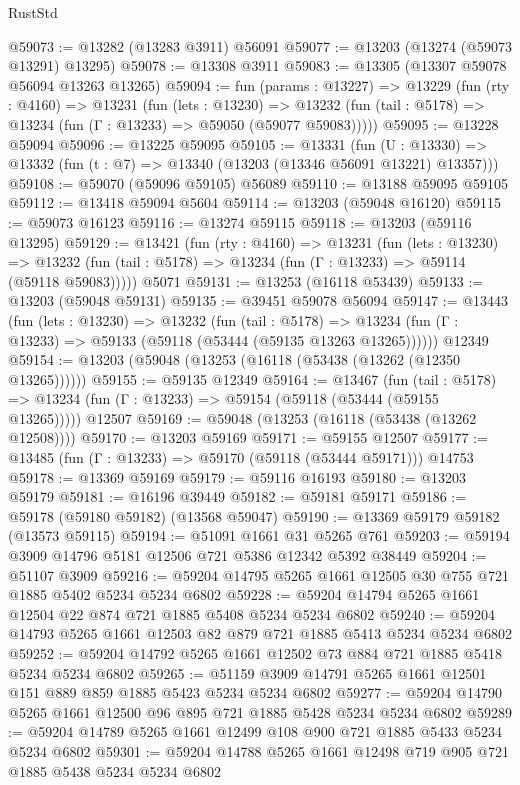 \begin{lexlean}{RustStd}
\begin{coremodule}
@59073 := @13282 (@13283 @3911) @56091
@59077 := @13203 (@13274 (@59073 @13291) @13295)
@59078 := @13308 @3911
@59083 := @13305 (@13307 @59078 @56094 @13263 @13265)
@59094 := fun (params : @13227) =>
  @13229
    (fun (rty : @4160) =>
    @13231
      (fun (lets : @13230) =>
      @13232 (fun (tail : @5178) => @13234 (fun (Γ : @13233) => @59050 (@59077 @59083)))))
@59095 := @13228 @59094
@59096 := @13225 @59095
@59105 := @13331
    (fun (U : @13330) => @13332 (fun (t : @7) => @13340 (@13203 (@13346 @56091 @13221) @13357)))
@59108 := @59070 (@59096 @59105) @56089
@59110 := @13188 @59095 @59105
@59112 := @13418 @59094 @5604
@59114 := @13203 (@59048 @16120)
@59115 := @59073 @16123
@59116 := @13274 @59115
@59118 := @13203 (@59116 @13295)
@59129 := @13421
    (fun (rty : @4160) =>
    @13231
      (fun (lets : @13230) =>
      @13232 (fun (tail : @5178) => @13234 (fun (Γ : @13233) => @59114 (@59118 @59083)))))
    @5071
@59131 := @13253 (@16118 @53439)
@59133 := @13203 (@59048 @59131)
@59135 := @39451 @59078 @56094
@59147 := @13443
    (fun (lets : @13230) =>
    @13232
      (fun (tail : @5178) =>
      @13234 (fun (Γ : @13233) => @59133 (@59118 (@53444 (@59135 @13263 @13265))))))
    @12349
@59154 := @13203 (@59048 (@13253 (@16118 (@53438 (@13262 (@12350 @13265))))))
@59155 := @59135 @12349
@59164 := @13467
    (fun (tail : @5178) => @13234 (fun (Γ : @13233) => @59154 (@59118 (@53444 (@59155 @13265)))))
    @12507
@59169 := @59048 (@13253 (@16118 (@53438 (@13262 @12508))))
@59170 := @13203 @59169
@59171 := @59155 @12507
@59177 := @13485 (fun (Γ : @13233) => @59170 (@59118 (@53444 @59171))) @14753
@59178 := @13369 @59169
@59179 := @59116 @16193
@59180 := @13203 @59179
@59181 := @16196 @39449
@59182 := @59181 @59171
@59186 := @59178 (@59180 @59182) (@13568 @59047)
@59190 := @13369 @59179 @59182 (@13573 @59115)
@59194 := @51091 @1661 @31 @5265 @761
@59203 := @59194 @3909 @14796 @5181 @12506 @721 @5386 @12342 @5392 @38449
@59204 := @51107 @3909
@59216 := @59204 @14795 @5265 @1661 @12505 @30 @755 @721 @1885 @5402 @5234 @5234 @6802
@59228 := @59204 @14794 @5265 @1661 @12504 @22 @874 @721 @1885 @5408 @5234 @5234 @6802
@59240 := @59204 @14793 @5265 @1661 @12503 @82 @879 @721 @1885 @5413 @5234 @5234 @6802
@59252 := @59204 @14792 @5265 @1661 @12502 @73 @884 @721 @1885 @5418 @5234 @5234 @6802
@59265 := @51159 @3909 @14791 @5265 @1661 @12501 @151 @889 @859 @1885 @5423 @5234 @5234 @6802
@59277 := @59204 @14790 @5265 @1661 @12500 @96 @895 @721 @1885 @5428 @5234 @5234 @6802
@59289 := @59204 @14789 @5265 @1661 @12499 @108 @900 @721 @1885 @5433 @5234 @5234 @6802
@59301 := @59204 @14788 @5265 @1661 @12498 @719 @905 @721 @1885 @5438 @5234 @5234 @6802

\end{coremodule}
\end{lexlean}

